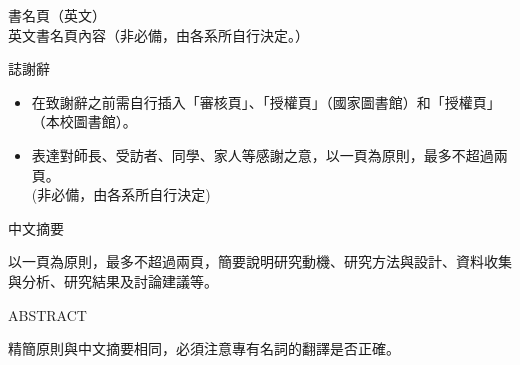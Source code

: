 \documentclass[12pt,oneside,openany,a4paper]{book}
\begin{document}
\pagestyle{plain}
\parindent=0.8cm

\newpage
\thispagestyle{empty}


\newpage
\thispagestyle{empty}
\begin{center}
\end{center}

\newpage
\thispagestyle{empty}


\newpage
\thispagestyle{empty}
\noindent 書名頁（英文）\\
英文書名頁內容（非必備，由各系所自行決定。）

\newpage
\thispagestyle{empty}
\begin{center}
    {\LARGE{誌謝辭}}
\end{center}
\begin{itemize}
    \item 在致謝辭之前需自行插入「審核頁」、「授權頁」（國家圖書館）和「授權頁」（本校圖書館）。
    \item 表達對師長、受訪者、同學、家人等感謝之意，以一頁為原則，最多不超過兩頁。\\
          (非必備，由各系所自行決定)
\end{itemize}

\frontmatter
\begin{center}
    {\LARGE{中文摘要}}
\end{center}
以一頁為原則，最多不超過兩頁，簡要說明研究動機、研究方法與設計、資料收集與分析、研究結果及討論建議等。

\newpage
\begin{center}
    {\LARGE ABSTRACT}
\end{center}
精簡原則與中文摘要相同，必須注意專有名詞的翻譯是否正確。
\end{document}
